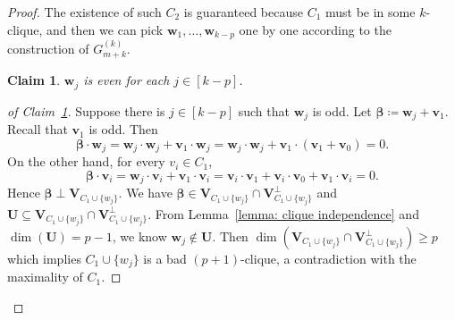 \documentclass[
final
]{dmtcs-episciences}
\newtheorem{claim}[theorem]{Claim}
\begin{document}
\begin{proof}
The existence of such $C_2$ is guaranteed because $C_1$ must be in some $k$-clique, and then we can pick $\mathbf{w}_1, \ldots, \mathbf{w}_{k-p}$ one by one according to the construction of $G^{(k)}_{m+k}$.

\begin{claim}\label{w even}
    $\textbf{w}_j$ is even for each $j\in[k-p]$.
\end{claim}

\begin{proof}[of Claim~\ref{w even}]
Suppose there is $j\in[k-p]$ such that $\textbf{w}_j$ is odd. Let  $\boldsymbol{\beta} \coloneqq \textbf{w}_j+\textbf{v}_1$. Recall that $\textbf{v}_1$ is odd.
Then 
\[
    \boldsymbol{\beta} \cdot \textbf{w}_j=\textbf{w}_j\cdot \textbf{w}_j+\textbf{v}_1\cdot \textbf{w}_j=\textbf{w}_j\cdot \textbf{w}_j+\textbf{v}_1\cdot (\textbf{v}_1+ \textbf{v}_0)=0.
\]
On the other hand, for every $v_i\in C_1$, 
\[
    \boldsymbol{\beta} \cdot \textbf{v}_i=\textbf{w}_j\cdot \textbf{v}_i+\textbf{v}_1\cdot \textbf{v}_i=\textbf{v}_i\cdot \textbf{v}_1+\textbf{v}_i\cdot \textbf{v}_0+\textbf{v}_1\cdot \textbf{v}_i=0.
\]
Hence $\boldsymbol{\beta} \perp \textbf{V}_{C_1\cup\{w_j\}}$. We have $\boldsymbol{\beta} \in \textbf{V}_{C_1\cup\{w_j\}}\cap \textbf{V}_{C_1\cup\{w_j\}}^{\perp}$ and $\textbf{U}\subseteq \textbf{V}_{C_1\cup\{w_j\}}\cap \textbf{V}_{C_1\cup\{w_j\}}^{\perp}$. From Lemma~\ref{lemma: clique independence} and $\dim(\textbf{U})= p-1$, we know $\textbf{w}_j \notin \textbf{U}$. Then $\dim(\textbf{V}_{C_1\cup\{w_j\}}\cap \textbf{V}_{C_1\cup\{w_j\}}^{\perp})\ge p$ which implies  $ C_1\cup \{w_j\}$ is a bad $(p+1)$-clique, a contradiction with the maximality of $C_1$.
\end{proof}

\vspace{.2cm}


\end{proof}
\end{document}
